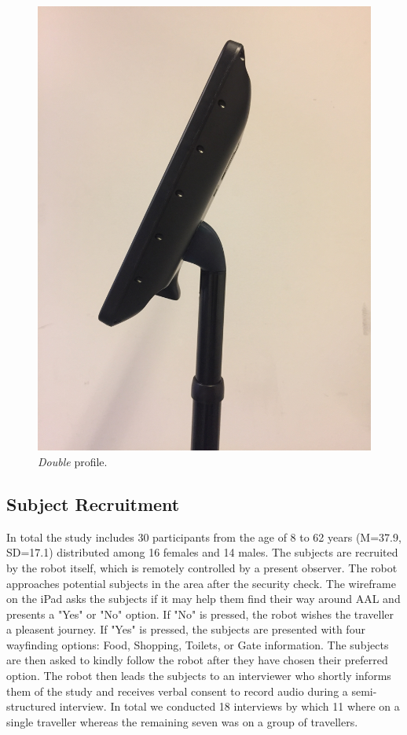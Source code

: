 \begin{figure}[H]
\begin{minipage}{.25\textwidth}
  \includegraphics[width=\linewidth, angle =-90]{Figure/ModificeretDoubleSideClose}
  \caption{\textit{Double} profile.}
  \label{fig:ModificeretDoubleSideClose}
\end{minipage}
\end{figure}
\noindent
%
\subsection{Subject Recruitment}
In total the study includes 30 participants from the age of 8 to 62 years (M=37.9, SD=17.1) distributed among 16 females and 14 males. The subjects are recruited by the robot itself, which is remotely controlled by a present observer. The robot approaches potential subjects in the area after the security check. The wireframe on the iPad asks the subjects if it may help them find their way around AAL and presents a "Yes" or "No" option. If "No" is pressed, the robot wishes the traveller a pleasent journey. If "Yes" is pressed, the subjects are presented with four wayfinding options: Food, Shopping, Toilets, or Gate information. The subjects are then asked to kindly follow the robot after they have chosen their preferred option. The robot then leads the subjects to an interviewer who shortly informs them of the study and receives verbal consent to record audio during a semi-structured interview. In total we conducted 18 interviews by which 11 where on a single traveller whereas the remaining seven was on a group of travellers. 
 
